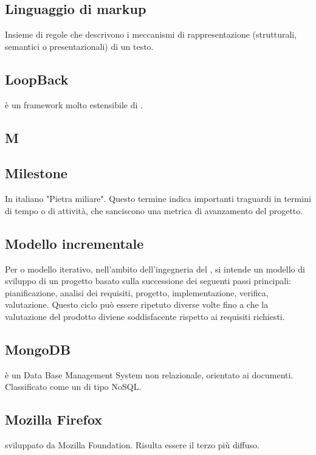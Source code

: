 \subsection*{Linguaggio di markup}
Insieme di regole che descrivono i meccanismi di rappresentazione (strutturali, semantici o presentazionali) di un testo.

\subsection*{LoopBack}
 è un framework  molto estensibile di . 

\newpage

\begin{center}
\Huge\section*{\uppercase{M}}
\end{center}

\subsection*{Milestone}
In italiano "Pietra miliare". Questo termine indica importanti traguardi in termini di
tempo o di attività, che sanciscono una metrica di avanzamento del progetto.

\subsection*{Modello incrementale}
Per  o modello iterativo, nell'ambito dell'ingegneria
del , si intende un modello di sviluppo di un progetto  basato sulla successione
dei seguenti passi principali: pianificazione, analisi dei requisiti, progetto, implementazione,
verifica, valutazione. Questo ciclo può essere ripetuto diverse volte fino a che la valutazione
del prodotto diviene soddisfacente rispetto ai requisiti richiesti.

\subsection*{MongoDB}
 è un Data Base Management System non relazionale, orientato ai documenti. Classificato come un  di tipo NoSQL.

\subsection*{Mozilla Firefox}
   sviluppato da Mozilla Foundation. Risulta essere il terzo
 più diffuso.

